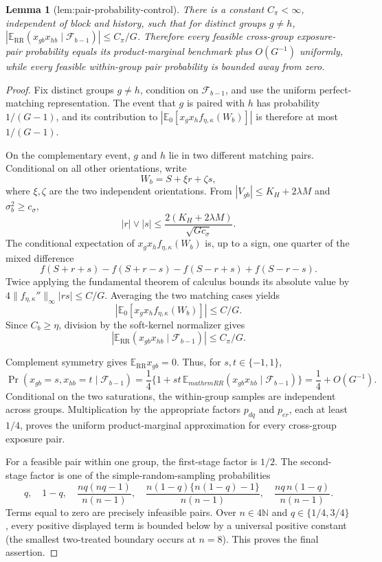 \documentclass{article}
\newtheorem{lemma}{Lemma}
\begin{document}
\begin{lemma}[lem:pair-probability-control]\label{lem:pair-probability-control}
There is a constant \(C_\pi<\infty\), independent of block and history, such that for distinct groups \(g\neq h\), \(\left|\mathbb E_{\mathrm{RR}}(x_{gb}x_{hb}\mid\mathcal F_{b-1})\right|\leq C_\pi/G\). Therefore every feasible cross-group exposure-pair probability equals its product-marginal benchmark plus \(O(G^{-1})\) uniformly, while every feasible within-group pair probability is bounded away from zero.
\end{lemma}
\begin{proof}
Fix distinct groups \(g\neq h\), condition on \(\mathcal F_{b-1}\), and use the uniform perfect-matching representation.  The event that \(g\) is paired with \(h\) has probability \(1/(G-1)\), and its contribution to \(|\mathbb E_0[x_gx_hf_{\eta,\kappa}(W_b)]|\) is therefore at most \(1/(G-1)\).

On the complementary event, \(g\) and \(h\) lie in two different matching pairs.  Conditional on all other orientations, write
\[
 W_b=S+\xi r+\zeta s,
\]
where \(\xi,\zeta\) are the two independent orientations.  From \(|V_{gb}|\leq K_H+2\lambda M\) and \(\sigma_b^2\geq c_\sigma\),
\[
 |r|\vee|s|\leq\frac{2(K_H+2\lambda M)}{\sqrt{Gc_\sigma}}.
\]
The conditional expectation of \(x_gx_hf_{\eta,\kappa}(W_b)\) is, up to a sign, one quarter of the mixed difference
\[
 f(S+r+s)-f(S+r-s)-f(S-r+s)+f(S-r-s).
\]
Twice applying the fundamental theorem of calculus bounds its absolute value by
\(4\|f_{\eta,\kappa}''\|_\infty|rs|\leq C/G\).  Averaging the two matching cases yields
\[
 |\mathbb E_0[x_gx_hf_{\eta,\kappa}(W_b)]|\leq C/G.
\]
Since \(C_b\geq\eta\), division by the soft-kernel normalizer gives
\[
 |\mathbb E_{\mathrm{RR}}(x_{gb}x_{hb}\mid\mathcal F_{b-1})|
 \leq C_\pi/G.
\]

Complement symmetry gives \(\mathbb E_{\mathrm{RR}}x_{gb}=0\).  Thus, for \(s,t\in\{-1,1\}\),
\[
 \Pr(x_{gb}=s,x_{hb}=t\mid\mathcal F_{b-1})
 =\frac14\{1+st\,\mathbb E_{mathrm{RR}}(x_{gb}x_{hb}\mid\mathcal F_{b-1})\}
 =\frac14+O(G^{-1}).
\]
Conditional on the two saturations, the within-group samples are independent across groups.  Multiplication by the appropriate factors \(p_{dq}\) and \(p_{er}\), each at least \(1/4\), proves the uniform product-marginal approximation for every cross-group exposure pair.

For a feasible pair within one group, the first-stage factor is \(1/2\).  The second-stage factor is one of the simple-random-sampling probabilities
\[
 q,\quad 1-q,\quad
 \frac{nq(nq-1)}{n(n-1)},\quad
 \frac{n(1-q)\{n(1-q)-1\}}{n(n-1)},\quad
 \frac{nq\,n(1-q)}{n(n-1)}.
\]
Terms equal to zero are precisely infeasible pairs.  Over \(n\in4\mathbb N\) and \(q\in\{1/4,3/4\}\), every positive displayed term is bounded below by a universal positive constant (the smallest two-treated boundary occurs at \(n=8\)).  This proves the final assertion.
\end{proof}
\end{document}
